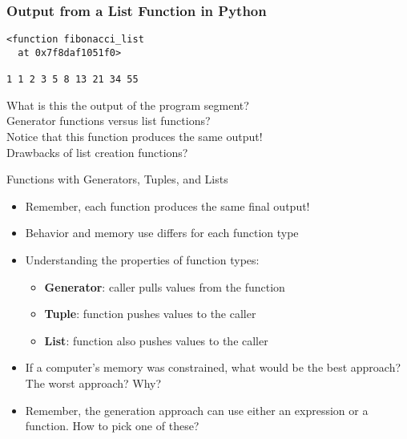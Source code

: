 \documentclass[14pt,aspectratio=169]{beamer}
\begin{document}
%
\begin{frame}[fragile]
  \frametitle{Output from a List Function in Python}
  \normalsize
  \begin{minipage}{6in}
    \vspace*{.1in}
    \begin{verbatim}
<function fibonacci_list
  at 0x7f8daf1051f0>

1 1 2 3 5 8 13 21 34 55
    \end{verbatim}
  \vspace*{.35in}
  \begin{minipage}{5.2in}
  \begin{center}
    \normalsize \noindent What is this the output of the program segment? \\
    \normalsize \noindent Generator functions versus list functions? \\
    \normalsize \noindent Notice that this function produces the same output! \\
    \normalsize \noindent Drawbacks of list creation functions? \\
  \end{center}
  \end{minipage}
  \end{minipage}
\end{frame}

%
\begin{frame}{Functions with Generators, Tuples, and Lists}
  \begin{itemize}
    \item Remember, each function produces the same final output!
      \vspace*{-.15in}
    \item Behavior and memory use differs for each function type
      \vspace*{-.15in}
    \item Understanding the properties of function types:
      \begin{itemize}
        \item {\bf Generator}: caller pulls values from the function
        \item {\bf Tuple}: function pushes values to the caller
        \item {\bf List}: function also pushes values to the caller
      \end{itemize}
      \vspace*{-.2in}
    \item If a computer's memory was constrained, what would be the best
      approach? The worst approach? Why?
      \vspace*{-.2in}
    \item Remember, the generation approach can use either an expression or a
      function. How to pick one of these?
  \end{itemize}
\end{frame}
\end{document}
